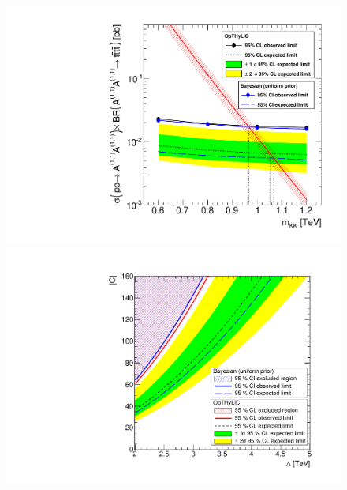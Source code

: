 \begin{frame}
\vspace*{-2.5cm}
\begin{figure}[!htb]
\begin{center}
\includegraphics[width=0.38\linewidth]{Figures/FourTops/ExclusionPlot_RPPFullStat_OTHVsBayesian.pdf}
\includegraphics[width=0.4\linewidth]{Figures/FourTops/CVsLambdaForContactInteractionHybridVsBayesian.pdf}
\end{center}
\end{figure}

\end{frame}

